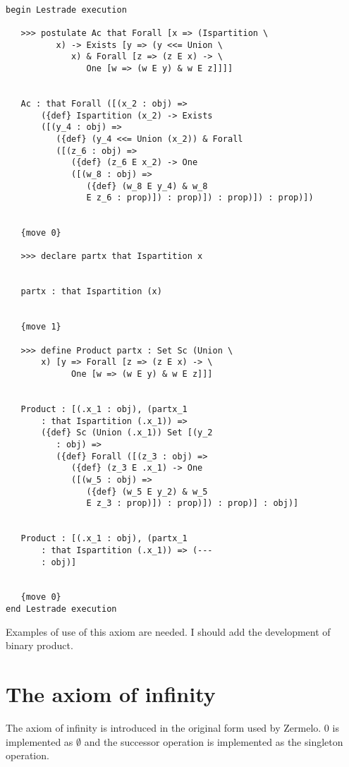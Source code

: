 \documentclass[12pt]{article}
\begin{document}
\begin{verbatim}

begin Lestrade execution

   >>> postulate Ac that Forall [x => (Ispartition \
          x) -> Exists [y => (y <<= Union \
             x) & Forall [z => (z E x) -> \
                One [w => (w E y) & w E z]]]]


   Ac : that Forall ([(x_2 : obj) => 
       ({def} Ispartition (x_2) -> Exists 
       ([(y_4 : obj) => 
          ({def} (y_4 <<= Union (x_2)) & Forall 
          ([(z_6 : obj) => 
             ({def} (z_6 E x_2) -> One 
             ([(w_8 : obj) => 
                ({def} (w_8 E y_4) & w_8 
                E z_6 : prop)]) : prop)]) : prop)]) : prop)])


   {move 0}

   >>> declare partx that Ispartition x


   partx : that Ispartition (x)


   {move 1}

   >>> define Product partx : Set Sc (Union \
       x) [y => Forall [z => (z E x) -> \
             One [w => (w E y) & w E z]]]


   Product : [(.x_1 : obj), (partx_1 
       : that Ispartition (.x_1)) => 
       ({def} Sc (Union (.x_1)) Set [(y_2 
          : obj) => 
          ({def} Forall ([(z_3 : obj) => 
             ({def} (z_3 E .x_1) -> One 
             ([(w_5 : obj) => 
                ({def} (w_5 E y_2) & w_5 
                E z_3 : prop)]) : prop)]) : prop)] : obj)]


   Product : [(.x_1 : obj), (partx_1 
       : that Ispartition (.x_1)) => (--- 
       : obj)]


   {move 0}
end Lestrade execution
\end{verbatim}

Examples of use of this axiom are needed.  I should add the development of binary product.


\section{The axiom of infinity}

The axiom of infinity is introduced in the original form used by Zermelo.  0 is implemented as $\emptyset$ and the successor operation is implemented as the singleton operation.
\end{document}
